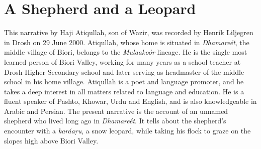 \appendix
{}

\section*{A Shepherd and a Leopard}

This narrative by Haji Atiqullah, son of Wazir, was recorded by Henrik Liljegren in Drosh on 29 June 2000. Atiqullah, whose home is situated in \textit{Dhamareét}, the middle village of Biori, belongs to the \textit{Mulaakoór} lineage. He is the single most learned person of Biori Valley, working for many years as a school teacher at Drosh Higher Secondary school and later serving as headmaster of the middle school in his home village. Atiqullah is a poet and language promoter, and he takes a deep interest in all matters related to language and education. He is a fluent speaker of Pashto, Khowar, Urdu and English, and is also knowledgeable in Arabic and Persian. The present narrative is the account of an unnamed shepherd who lived long ago in \textit{Dhamareét}. It tells about the shepherd’s encounter with a \textit{karáaṛu}, a snow leopard, while taking his flock to graze on the slopes high above Biori Valley.

